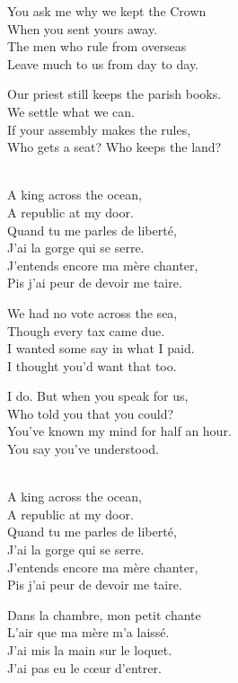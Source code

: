 \begin{lyrics}
You ask me why we kept the Crown\\
When you sent yours away.\\
The men who rule from overseas\\
Leave much to us from day to day.

Our priest still keeps the parish books.\\
We settle what we can.\\
If your assembly makes the rules,\\
Who gets a seat? Who keeps the land?

\\
A king across the ocean,\\
A republic at my door.\\
Quand tu me parles de liberté,\\
J’ai la gorge qui se serre.\\
J’entends encore ma mère chanter,\\
Pis j’ai peur de devoir me taire.


We had no vote across the sea,\\
Though every tax came due.\\
I wanted some say in what I paid.\\
I thought you’d want that too.

I do. But when you speak for us,\\
Who told you that you could?\\
You’ve known my mind for half an hour.\\
You say you’ve understood.

\\
A king across the ocean,\\
A republic at my door.\\
Quand tu me parles de liberté,\\
J’ai la gorge qui se serre.\\
J’entends encore ma mère chanter,\\
Pis j’ai peur de devoir me taire.

Dans la chambre, mon petit chante\\
L’air que ma mère m’a laissé.\\
J’ai mis la main sur le loquet.\\
J’ai pas eu le cœur d’entrer.


\end{lyrics}
